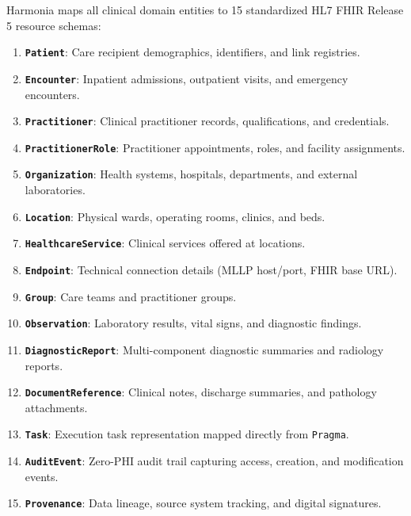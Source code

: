 Harmonia maps all clinical domain entities to 15 standardized HL7 FHIR Release 5 resource schemas:
\begin{enumerate}
    \item \textbf{\texttt{Patient}}: Care recipient demographics, identifiers, and link registries.
    \item \textbf{\texttt{Encounter}}: Inpatient admissions, outpatient visits, and emergency encounters.
    \item \textbf{\texttt{Practitioner}}: Clinical practitioner records, qualifications, and credentials.
    \item \textbf{\texttt{PractitionerRole}}: Practitioner appointments, roles, and facility assignments.
    \item \textbf{\texttt{Organization}}: Health systems, hospitals, departments, and external laboratories.
    \item \textbf{\texttt{Location}}: Physical wards, operating rooms, clinics, and beds.
    \item \textbf{\texttt{HealthcareService}}: Clinical services offered at locations.
    \item \textbf{\texttt{Endpoint}}: Technical connection details (MLLP host/port, FHIR base URL).
    \item \textbf{\texttt{Group}}: Care teams and practitioner groups.
    \item \textbf{\texttt{Observation}}: Laboratory results, vital signs, and diagnostic findings.
    \item \textbf{\texttt{DiagnosticReport}}: Multi-component diagnostic summaries and radiology reports.
    \item \textbf{\texttt{DocumentReference}}: Clinical notes, discharge summaries, and pathology attachments.
    \item \textbf{\texttt{Task}}: Execution task representation mapped directly from \texttt{Pragma}.
    \item \textbf{\texttt{AuditEvent}}: Zero-PHI audit trail capturing access, creation, and modification events.
    \item \textbf{\texttt{Provenance}}: Data lineage, source system tracking, and digital signatures.
\end{enumerate}

\newpage
